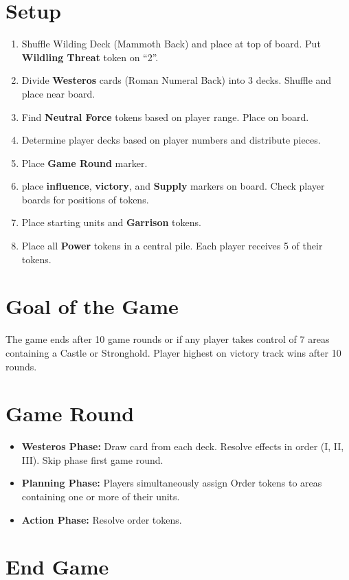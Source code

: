 \documentclass[12pt]{article}
\newenvironment{enumerateCustom}
{\begin{enumerate}
  \setlength{\itemsep}{1pt}
  \setlength{\parskip}{0pt}
  \setlength{\parsep}{0pt}}
{\end{enumerate}}
\newenvironment{itemizeCustom}
{\begin{itemize}
  \setlength{\itemsep}{1pt}
  \setlength{\parskip}{0pt}
  \setlength{\parsep}{0pt}}
{\end{itemize}}
\begin{document}
\begin{mdframed}[style = customFrame]
\begin{multicols*}{2}

\section*{Setup}
\begin{enumerateCustom}
	\item Shuffle Wilding Deck (Mammoth Back) and place at top of board. Put \textbf{Wildling Threat} token on ``2''.
	\item Divide \textbf{Westeros} cards (Roman Numeral Back) into 3 decks. Shuffle and place near board.
	\item Find \textbf{Neutral Force} tokens based on player range. Place on board.
	\item Determine player decks based on player numbers and distribute pieces.
	\item Place \textbf{Game Round} marker.
	\item place \textbf{influence}, \textbf{victory}, and \textbf{Supply} markers on board. Check player boards for positions of tokens.
	\item Place starting units and \textbf{Garrison} tokens.
	\item Place all \textbf{Power} tokens in a central pile. Each player receives 5 of their tokens.
\end{enumerateCustom}

\section*{Goal of the Game}
The game ends after 10 game rounds or if any player takes control of 7 areas containing a Castle or Stronghold. Player highest on victory track wins after 10 rounds.

\section*{Game Round}
\begin{itemizeCustom}
	\item \textbf{Westeros Phase:} Draw card from each deck. Resolve effects in order (I, II, III). Skip phase first game round.
	\item \textbf{Planning Phase:} Players simultaneously assign Order tokens to areas containing one or more of their units.
	\item \textbf{Action Phase:} Resolve order tokens.
\end{itemizeCustom}

\section*{End Game}

\end{multicols*}
\end{mdframed}
\end{document}
